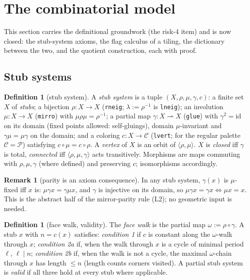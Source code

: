 \documentclass[11pt]{article}
\theoremstyle{definition}
\newtheorem{definition}[theorem]{Definition}
\newtheorem{remark}[theorem]{Remark}
\begin{document}
\section{The combinatorial model}\label{sec:model}

This section carries the definitional groundwork (the risk-4 item) and is now closed:
the stub-system axioms, the flag calculus of a tiling, the dictionary between the two,
and the quotient construction, each with proof.

\subsection{Stub systems}

\begin{definition}[stub system]\label{def:stub}
A \emph{stub system} is a tuple $(X, \rho, \mu, \gamma, c)$: a finite set $X$ of
\emph{stubs}; a bijection $\rho : X \to X$ (\texttt{rneig}; $\lambda := \rho^{-1}$ is
\texttt{lneig}); an involution $\mu : X \to X$ (\texttt{mirro}) with
$\mu\rho\mu = \rho^{-1}$; a partial map $\gamma : X \rightharpoonup X$ (\texttt{glue})
with $\gamma^2 = \mathrm{id}$ on its domain (fixed points allowed: self-gluings), domain
$\mu$-invariant and $\gamma\mu = \mu\gamma$ on the domain; and a coloring
$c : X \to \mathcal{C}$ (\texttt{lvert}; for the regular palette
$\mathcal{C} = \mathcal{P}$) satisfying $c \circ \mu = c \circ \rho$. A \emph{vertex} of
$X$ is an orbit of $\langle \rho, \mu \rangle$. $X$ is \emph{closed} iff $\gamma$ is
total, \emph{connected} iff $\langle \rho, \mu, \gamma \rangle$ acts transitively.
Morphisms are maps commuting with $\rho, \mu, \gamma$ (where defined) and preserving $c$;
isomorphisms accordingly.
\end{definition}

\begin{remark}[parity is an axiom consequence]\label{rem:parity}
In any stub system, $\gamma(x)$ is $\mu$-fixed iff $x$ is: $\mu\gamma x = \gamma\mu x$,
and $\gamma$ is injective on its domain, so $\mu\gamma x = \gamma x \iff \mu x = x$.
This is the abstract half of the mirror-parity rule (L2); no geometric input is needed.
\end{remark}

\begin{definition}[face walk, validity]\label{def:valid}
The \emph{face walk} is the partial map $\omega := \rho \circ \gamma$. A stub $x$ with
$n = c(x)$ satisfies:
\emph{condition 1} if $c$ is constant along the $\omega$-walk through $x$;
\emph{condition 2a} if, when the walk through $x$ is a cycle of minimal period $\ell$,
$\ell \mid n$;
\emph{condition 2b} if, when the walk is not a cycle, the maximal $\omega$-chain through
$x$ has length $\le n$ (length counts corners visited).
A partial stub system is \emph{valid} if all three hold at every stub where applicable.
\end{definition}
\end{document}
